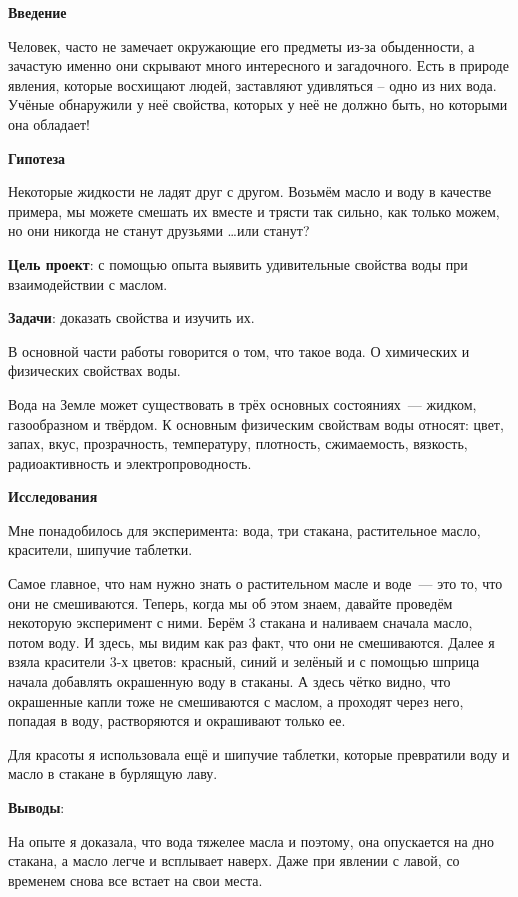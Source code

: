 


\makeProcTitleSchool



\textbf{Введение}

Человек, часто не замечает окружающие его предметы из-за обыденности, а зачастую именно они скрывают много интересного и загадочного. Есть в природе явления, которые восхищают людей, заставляют удивляться – одно из них вода. Учёные обнаружили у неё свойства, которых у неё не должно быть, но которыми она обладает!

\textbf{Гипотеза}

Некоторые жидкости не ладят друг с другом. Возьмём масло и воду в качестве примера, мы можете смешать их вместе и трясти так сильно, как только можем, но они никогда не станут друзьями \dots или станут?

\textbf{Цель проект}: с помощью опыта выявить удивительные свойства воды при взаимодействии с маслом.

\textbf{Задачи}: доказать свойства и изучить их.

В основной части работы говорится о том, что такое вода. О химических и физических свойствах воды.

Вода на Земле может существовать в трёх основных состояниях~--- жидком, газообразном и твёрдом. К основным физическим свойствам воды относят: цвет, запах, вкус, прозрачность, температуру, плотность, сжимаемость, вязкость, радиоактивность и электропроводность.

\textbf{Исследования}

Мне понадобилось для эксперимента: вода, три стакана, растительное масло, красители, шипучие таблетки.

Самое главное, что нам нужно знать о растительном масле и воде~--- это то, что они не смешиваются. Теперь, когда мы об этом знаем, давайте проведём некоторую эксперимент с ними. Берём 3 стакана и наливаем сначала масло, потом воду.	И здесь, мы видим как раз факт, что они не смешиваются. Далее я взяла красители 3-х цветов: красный, синий и зелёный и с помощью шприца начала добавлять окрашенную воду в стаканы. А здесь чётко видно, что окрашенные капли тоже не смешиваются с маслом, а проходят через него,  попадая в воду, растворяются и окрашивают только ее.

Для красоты я использовала ещё и шипучие таблетки, которые превратили воду и масло в стакане в бурлящую лаву.

\textbf{Выводы}:

На опыте я доказала, что вода тяжелее масла и поэтому,  она опускается на дно стакана, а масло легче и всплывает наверх. Даже при явлении с лавой, со временем  снова все встает на свои места.
